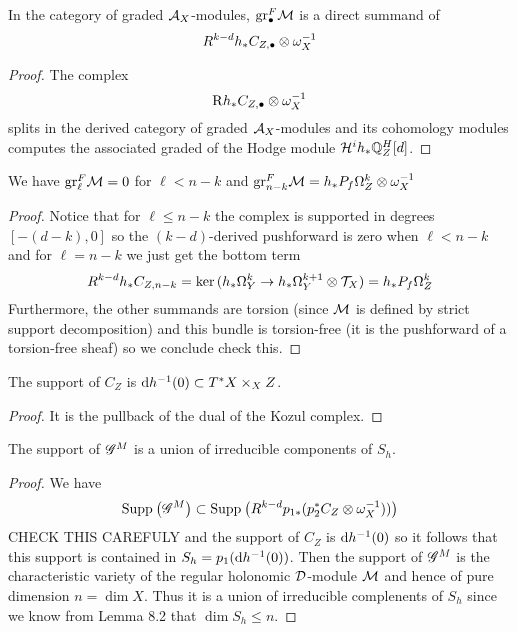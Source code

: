 \documentclass[12pt]{article}
\renewcommand{\gr}{\mathrm{gr}}
\newcommand{\R}{\mathrm{R}}
\begin{document}
\begin{prop}
In the category of graded $\mathcal{A}_X$-modules, $\gr_\bullet^F \cM$ is a direct summand of 
\[ R^{k-d} h_* C_{Z, \bullet} \otimes \omega_X^{-1} \]
\end{prop}

\begin{proof}
The complex
\[ \R h_* C_{Z, \bullet} \ot \omega_X^{-1} \]
splits in the derived category of graded $\mathcal{A}_X$-modules and its cohomology modules computes the associated graded of the Hodge module $\mathcal{H}^i h_* \mathbb{Q}_Z^H[d]$. 
\end{proof}

\begin{cor}
We have $\gr^F_{\ell} \cM = 0$ for $\ell < n - k$ and $\gr^F_{n - k} \cM = h_* P_f \Omega_Z^k \ot \omega_X^{-1}$
\end{cor}

\begin{proof}
Notice that for $\ell \le n - k$ the complex is supported in degrees $[-(d-k), 0]$ so the $(k-d)$-derived pushforward is zero when $\ell < n - k$ and for $\ell = n - k$ we just get the bottom term
\[ R^{k-d} h_* C_{Z, n-k} = \ker{(h_* \Omega_Y^k \to h_* \Omega_Y^{k+1} \otimes\mathcal{T}_X)} = h_* P_f \Omega_Z^k \]
Furthermore, the other summands are torsion (since $\mathcal{M}$ is defined by strict support decomposition) and this bundle is torsion-free (it is the pushforward of a torsion-free sheaf) so we conclude {\color{red} check this}.
\end{proof}

\begin{prop}
The support of $C_Z$ is $\mathrm{d}{h}^{-1}(0) \subset T^* X \times_X Z$.
\end{prop}


\begin{proof}
It is the pullback of the dual of the Kozul complex. 
\end{proof}

\begin{cor}
The support of $\mathscr{G}^M$ is a union of irreducible components of $S_h$.
\end{cor}

\begin{proof}
We have
\[ \mathrm{Supp}_{}\left(\mathscr{G}^M \right) \subset \mathrm{Supp}_{}\left(R^{k-d} p_{1*} (p_2^* C_Z \otimes \omega_X^{-1})) \right) \]
{\color{red} CHECK THIS CAREFULY}
and the support of $C_Z$ is $\mathrm{d}{h}^{-1}(0)$ so it follows that this support is contained in $S_h = p_1(\mathrm{d}{h}^{-1}(0))$. Then the support of $\mathscr{G}^M$ is the characteristic variety of the regular holonomic $\mathcal{D}$-module $\mathcal{M}$ and hence of pure dimension $n = \dim{X}$. Thus it is a union of irreducible complenents of $S_h$ since we know from Lemma 8.2 that $\dim{S_h} \le n$.
\end{proof}
\end{document}
